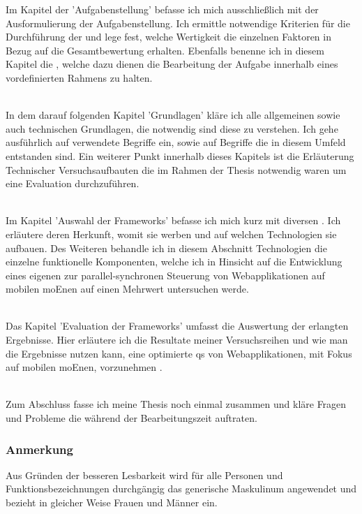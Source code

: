 \pagebreak
Im Kapitel der 'Aufgabenstellung' befasse ich mich ausschließlich mit der Ausformulierung der Aufgabenstellung. Ich ermittle notwendige Kriterien für die Durchführung der  und lege fest, welche Wertigkeit die einzelnen Faktoren in Bezug auf die Gesamtbewertung erhalten. Ebenfalls benenne ich in diesem Kapitel die , welche dazu dienen die Bearbeitung der Aufgabe innerhalb eines vordefinierten Rahmens zu halten.

\\In dem darauf folgenden Kapitel 'Grundlagen' kläre ich alle allgemeinen sowie auch technischen Grundlagen, die notwendig sind diese  zu verstehen. Ich gehe ausführlich auf verwendete Begriffe ein, sowie auf Begriffe die in diesem Umfeld entstanden sind. Ein weiterer Punkt innerhalb dieses Kapitels ist die Erläuterung Technischer Versuchsaufbauten die im Rahmen der Thesis notwendig waren um eine Evaluation durchzuführen.

\\Im Kapitel 'Auswahl der \Gls{Framework}s' befasse ich mich kurz mit diversen . Ich erläutere deren Herkunft, womit sie werben und auf welchen Technologien sie aufbauen. Des Weiteren behandle ich in diesem Abschnitt Technologien die einzelne funktionelle Komponenten, welche ich in Hinsicht auf die Entwicklung eines eigenen  zur \Gls{parallel-synchron}en Steuerung von Webapplikationen auf mobilen \Gls{moEn}en auf einen Mehrwert untersuchen werde.

\\Das Kapitel 'Evaluation der \Gls{Framework}s' umfasst die Auswertung der erlangten Ergebnisse. Hier erläutere ich die Resultate meiner Versuchsreihen und wie man die Ergebnisse nutzen kann, eine optimierte \Gls{qs} von Webapplikationen, mit Fokus auf mobilen \Gls{moEn}en, vorzunehmen .

\\Zum Abschluss fasse ich meine Thesis noch einmal zusammen und kläre Fragen und Probleme die während der Bearbeitungszeit auftraten.

\vfill
\subsubsection{Anmerkung}
Aus Gründen der besseren Lesbarkeit wird für alle Personen und Funktionsbezeichnungen durchgängig das generische Maskulinum angewendet und bezieht in gleicher Weise Frauen und Männer ein.